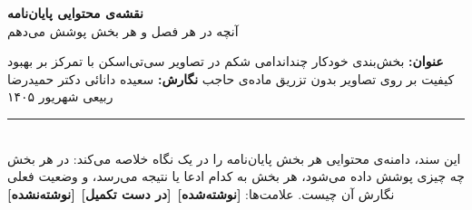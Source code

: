 \documentclass[a4paper,landscape,11pt]{article}
\newcommand{\done}{{\color{cok}\bfseries [نوشته‌شده]}}
\newcommand{\wip}{{\color{cwarn}\bfseries [در دست تکمیل]}}
\newcommand{\todo}{{\color{cred}\bfseries [نوشته‌نشده]}}
\begin{document}
\begin{center}
{\LARGE\bfseries نقشه‌ی محتوایی پایان‌نامه}\\[3pt]
{\large آنچه در هر فصل و هر بخش پوشش می‌دهم}
\end{center}
\vspace{1mm}

\begin{center}
\begin{minipage}{25.9cm}
\footnotesize
{\bfseries عنوان:} بخش‌بندی خودکار چنداندامی شکم در تصاویر سی‌تی‌اسکن با تمرکز بر بهبود کیفیت بر روی تصاویر بدون تزریق ماده‌ی حاجب \hfill
{\bfseries نگارش:} سعیده دانائی \quad\textbar{} دکتر حمیدرضا ربیعی \quad\textbar{} شهریور ۱۴۰۵\\[2pt]
\rule{\linewidth}{0.4pt}\\[2pt]
این سند، دامنه‌ی محتوایی هر بخش پایان‌نامه را در یک نگاه خلاصه می‌کند: در هر بخش چه چیزی پوشش داده می‌شود، هر بخش به کدام ادعا یا نتیجه می‌رسد، و وضعیت فعلی نگارش آن چیست. علامت‌ها: \done\ \wip\ \todo
\end{minipage}
\end{center}
\vspace{2mm}
\end{document}
